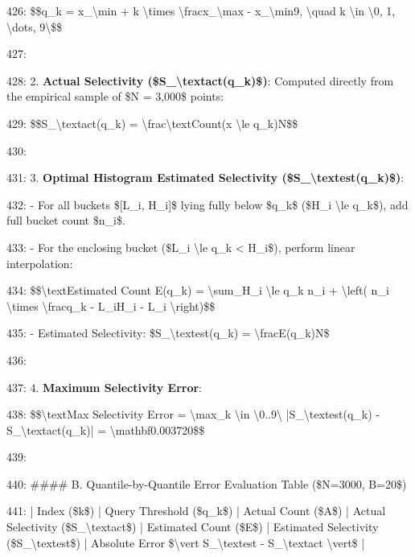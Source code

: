 \documentclass[11pt,a4paper]{article}
\begin{document}
426:    \$\$q\_k = x\_{\textbackslash{}min} + k \textbackslash{}times \textbackslash{}frac{x\_{\textbackslash{}max} - x\_{\textbackslash{}min}}{9}, \textbackslash{}quad k \textbackslash{}in \textbackslash{}{0, 1, \textbackslash{}dots, 9\textbackslash{}}\$\$

427:

428: 2. \textbf{Actual Selectivity (\$S\_{\textbackslash{}text{act}}(q\_k)\$)}: Computed directly from the empirical sample of \$N = 3,000\$ points:

429:    \$\$S\_{\textbackslash{}text{act}}(q\_k) = \textbackslash{}frac{\textbackslash{}text{Count}(x \textbackslash{}le q\_k)}{N}\$\$

430:

431: 3. \textbf{Optimal Histogram Estimated Selectivity (\$S\_{\textbackslash{}text{est}}(q\_k)\$)}:

432:    - For all buckets \$[L\_i, H\_i]\$ lying fully below \$q\_k\$ (\$H\_i \textbackslash{}le q\_k\$), add full bucket count \$n\_i\$.

433:    - For the enclosing bucket (\$L\_i \textbackslash{}le q\_k < H\_i\$), perform linear interpolation:

434:      \$\$\textbackslash{}text{Estimated Count } E(q\_k) = \textbackslash{}sum\_{H\_i \textbackslash{}le q\_k} n\_i + \textbackslash{}left( n\_i \textbackslash{}times \textbackslash{}frac{q\_k - L\_i}{H\_i - L\_i} \textbackslash{}right)\$\$

435:    - Estimated Selectivity: \$S\_{\textbackslash{}text{est}}(q\_k) = \textbackslash{}frac{E(q\_k)}{N}\$

436:

437: 4. \textbf{Maximum Selectivity Error}:

438:    \$\$\textbackslash{}text{Max Selectivity Error} = \textbackslash{}max\_{k \textbackslash{}in \textbackslash{}{0..9\textbackslash{}}} |S\_{\textbackslash{}text{est}}(q\_k) - S\_{\textbackslash{}text{act}}(q\_k)| = \textbackslash{}mathbf{0.003720}\$\$

439:

440: \#\#\#\# B. Quantile-by-Quantile Error Evaluation Table (\$N=3000, B=20\$)

441: | Index (\$k\$) | Query Threshold (\$q\_k\$) | Actual Count (\$A\$) | Actual Selectivity (\$S\_{\textbackslash{}text{act}}\$) | Estimated Count (\$E\$) | Estimated Selectivity (\$S\_{\textbackslash{}text{est}}\$) | Absolute Error \$\textbackslash{}vert S\_{\textbackslash{}text{est}} - S\_{\textbackslash{}text{act}} \textbackslash{}vert\$ |
\end{document}
